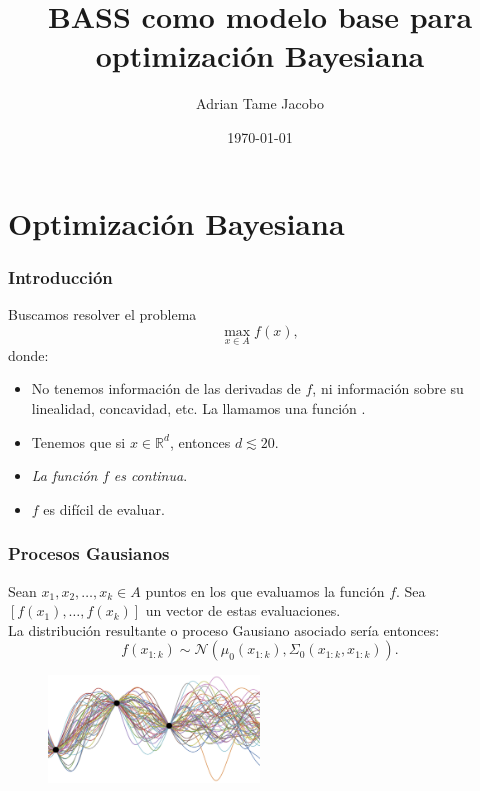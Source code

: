 \documentclass[fleqn]{beamer}
\title{BASS como modelo base para optimización Bayesiana}
\author{Adrian Tame Jacobo}
\institute[Instituto Tecnológico Autónomo de México]{ Temas Selectos de Estadística }
\date{\today}
\begin{document}
\begin{frame}
  \titlepage
\end{frame}

\section{Optimización Bayesiana}
\begin{frame}
  \frametitle{Introducción}
  Buscamos resolver el problema $$\max_{x \in A} f(x), $$
  donde: \begin{itemize}
      \item No tenemos información de las derivadas de $f$, ni información sobre su linealidad, concavidad, etc. La llamamos una función .
      \item Tenemos que si $x \in \mathbb{R}^d$, entonces $d \lesssim 20$. 
      \item \textit{La función} $f$ \textit{es continua}. 
      \item $f$ es difícil de evaluar.
  \end{itemize}
\end{frame}

\begin{frame}
  \frametitle{Procesos Gausianos}
  Sean $x_1, x_2, \ldots, x_k \in A$ puntos en los que evaluamos la función $f$. Sea $[f(x_1), \ldots, f(x_k)]$ un vector de estas evaluaciones. 
  \newline \\
  La distribución resultante o proceso Gausiano asociado sería entonces: 
  $$f(x_{1:k}) \sim \mathcal{N}(\mu_0(x_{1:k}), \Sigma_0(x_{1:k}, x_{1:k})).$$
  
  \begin{figure}[h]
    \centering
    \includegraphics[width=0.5\textwidth]{Figures/gp1.png}
    \label{fig:mesh1}
  \end{figure}
\end{frame}
\end{document}
